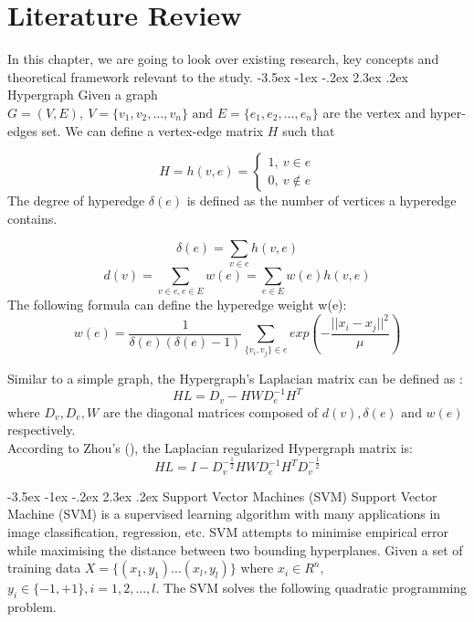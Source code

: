 \documentclass[12pt,a4paper,oneside,english]{report}
\makeatletter
\renewcommand\section{\@startsection {section}{1}{\z@}%
                                   {-3.5ex \@plus -1ex \@minus -.2ex}%
                                   {2.3ex \@plus.2ex}%
                                   {\centering\normalfont\LARGE\bfseries}}
\makeatother
\begin{document}

\newpage
\chapter{Literature Review}
In this chapter, we are going to look over existing research, key concepts and theoretical framework relevant to the study. 
\section{Hypergraph}
Given a graph \(G = (V,E), \ V = \{v_1,v_2,...,v_n\} \text{ and } E = \{e_1,e_2,...,e_n\} \) are the vertex and hyper-edges set. We can define a vertex-edge matrix \(H\) such that



\begin{equation} \label{eq:13}
  H = h(v,e) = \left\{
\begin{array}{ll}
      1,\ v \in e\\
      0,\  v \notin e
\end{array} 
\right. 
\end{equation}
The degree of hyperedge \( \delta(e) \) is defined as the number of vertices a hyperedge contains.

\[\delta(e) = \sum_{v \in e} h(v,e)\]
\[d(v) = \sum_{v \in e, e \in E} w(e) = \sum_{e \in E} w(e)h(v,e)\]
The following formula can define the hyperedge weight w(e):
\[ w(e) = \frac{1}{\delta(e)(\delta(e)-1)} \sum_{\{v_i,v_j\} \in e} exp \left( -\frac{||x_i - x_j||^2}{\mu}\right)\]

Similar to a simple graph, the Hypergraph's Laplacian matrix can be defined as \cite{Zhou}:
\begin{equation} \label{eq:14}
    HL = D_v - HWD_e^{-1}H^T
\end{equation}
where \(D_v, D_e, W\) are the diagonal matrices composed of \(d(v),\delta(e) \text{ and } w(e) \) respectively. 
\\ 
According to Zhou's (\cite{Zhou}), the Laplacian regularized Hypergraph matrix is:
\begin{equation}\label{eq:15}
    HL = I - D_v^{-\frac{1}{2}}HWD_e^{-1}H^TD_v^{-\frac{1}{2}}
\end{equation}


\section{Support Vector Machines (SVM)}
Support Vector Machine (SVM)\cite{cortes1995support} is a supervised learning algorithm with many applications in image classification, regression, etc. SVM attempts to minimise empirical error while maximising the distance between two bounding hyperplanes.
Given a set of training data \(X = \{(x_1,y_1)...(x_l,y_l)\}\) where \(x_i \in R^n\), \(y_i \in \{-1,+1\},i=1,2,...,l \). The SVM solves the following quadratic programming problem. 
\end{document}
